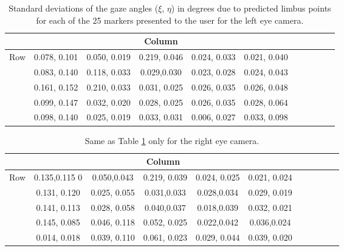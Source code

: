 \documentclass{article}
\begin{document}
\begin{table}[h!]
\caption{Standard deviations of the gaze angles ($\xi$, $\eta$) in degrees due to predicted limbus points for each of the 25 markers presented to the user for the left eye camera.  }
\vspace{0.5cm}
\centering
\begin{tabular}{|l|c|c|c|c|c|c|c|c|c|c|}
\hline
& \multicolumn{5}{|c|}{Column} \\
\hline
\multirow{5}{*}{Row} & 0.078, 0.101  & 0.050, 0.019 & 0.219, 0.046 & 0.024, 0.033 & 0.021, 0.040 \\ \cline{2-6}
                & 0.083, 0.140 & 0.118, 0.033  & 0.029,0.030  & 0.023, 0.028 & 0.024, 0.043 \\  \cline{2-6}
                & 0.161, 0.152 & 0.210, 0.033 & 0.031, 0.025 & 0.026, 0.035 & 0.026, 0.048 \\  \cline{2-6}
                & 0.099, 0.147 & 0.032, 0.020 & 0.028, 0.025 & 0.026, 0.035 & 0.028, 0.064 \\  \cline{2-6}
                & 0.098, 0.140 & 0.025, 0.019   & 0.033, 0.031   & 0.006, 0.027  & 0.033, 0.098  \\ 
\hline
\end{tabular}
\label{tab:std_limbus_gaze_error_cam_left}
\end{table}

\begin{table}[h!]
\caption{Same as Table \ref{tab:std_limbus_gaze_error_cam_left} only for the right eye camera.  }
\vspace{0.5cm}
\centering
\begin{tabular}{|l|c|c|c|c|c|c|c|c|c|c|}
\hline
& \multicolumn{5}{|c|}{Column} \\
\hline
\multirow{5}{*}{Row} & 0.135,0.115 0  & 0.050,0.043  & 0.219, 0.039 & 0.024, 0.025 & 0.021, 0.024 \\ \cline{2-6}
                & 0.131, 0.120 & 0.025, 0.055 & 0.031,0.033  & 0.028,0.034  & 0.029, 0.019 \\  \cline{2-6}
                & 0.141, 0.113 & 0.028, 0.058 & 0.040,0.037  & 0.018,0.039  & 0.032, 0.021 \\  \cline{2-6}
                & 0.145, 0.085  & 0.046, 0.118 & 0.052, 0.025  & 0.022,0.042  & 0.036,0.024  \\  \cline{2-6}
                & 0.014, 0.018 & 0.039, 0.110   & 0.061, 0.023   & 0.029, 0.044 & 0.039, 0.020 \\ 
\hline
\end{tabular}
\label{tab:std_limbus_gaze_error_cam_right}
\end{table}
\end{document}
